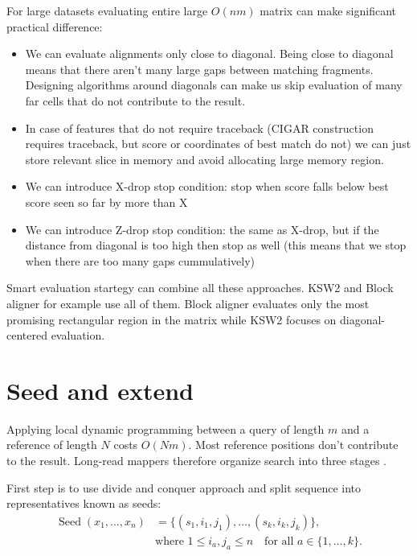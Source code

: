 For large datasets evaluating entire large \(O(nm)\) matrix can make significant practical difference:
\begin{itemize}
    \item We can evaluate alignments only close to diagonal. Being close to diagonal means that there aren't many large gaps between matching fragments. Designing algorithms around diagonals can make us skip evaluation of many far cells that do not contribute to the result.
    \item In case of features that do not require traceback (CIGAR construction requires traceback, but score or coordinates of best match do not) we can just store relevant slice in memory and avoid allocating large memory region.
    \item We can introduce X-drop stop condition: stop when score falls below best score seen so far by more than X
    \item We can introduce Z-drop stop condition: the same as X-drop, but if the distance from diagonal is too high then stop as well (this means that we stop when there are too many gaps cummulatively)
\end{itemize}

Smart evaluation startegy can combine all these approaches. KSW2 and Block aligner for example use all of them. Block aligner \cite{block_aligner_paper} evaluates only the most promising rectangular region in the matrix while KSW2 \cite{suzuki_kasahara_2018} focuses on diagonal-centered evaluation.

\section{Seed and extend}
\label{sec:seed-chain-extend}

Applying local dynamic programming between a query of length \(m\) and a
reference of length \(N\) costs \(O(Nm)\). Most reference positions don't contribute to the result. Long-read mappers therefore organize search into
three stages \cite{minimap2_paper}.

First step is to use divide and conquer approach and split sequence into representatives known as seeds:
\begin{equation}
\begin{aligned}
  \operatorname{Seed}(x_1,\ldots,x_n)
    &= \bigl\{(s_1,i_1,j_1),\ldots,(s_k,i_k,j_k)\bigr\},\\
    &\text{where }1\leq i_a,j_a\leq n
      \quad\text{for all }a\in\{1,\ldots,k\}.
\end{aligned}
\label{eq:seeding-def}
\end{equation}

